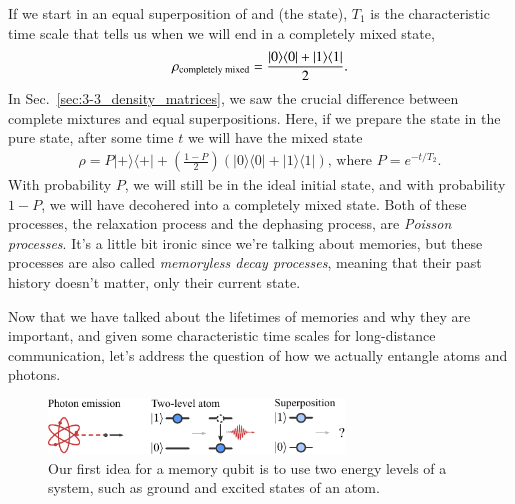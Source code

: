 If we start in an equal superposition of  and  (the \ket{+} state), $T_1$ is the characteristic time scale that tells us when we will end in a completely mixed state,
\begin{equation}
\begin{aligned}
\rho_{\textrm{completely mixed}} =\frac{|0 \rangle \langle 0|+|1 \rangle \langle 1|}{2}.
\end{aligned}
\end{equation}
In Sec.~\ref{sec:3-3_density_matrices}, we saw the crucial difference between complete mixtures and equal superpositions. Here, if we prepare the state in the pure state, after some time $t$ we will have the mixed state
\begin{equation}
\begin{aligned}
\rho=P|+\rangle\langle+|+\left(\frac{1-P}{2}\right)(|0\rangle\langle 0|+| 1\rangle\langle 1|)\text{, where }  P=e^{-t / T_2}.
\end{aligned}
\end{equation}
With probability $P$, we will still be in the ideal initial state, and with probability $1-P$, we will have decohered into a completely mixed state. Both of these processes, the relaxation process and the dephasing process, are \emph{Poisson processes}. It's a little bit ironic since we're talking about memories, but these processes are also called \emph{memoryless decay processes}, meaning that their past history doesn't matter, only their current state.

Now that we have talked about the lifetimes of memories and why they are important, and given some characteristic time scales for long-distance communication, let's address the question of how we actually entangle atoms and photons.

\begin{figure}[t]
    \centering
    \includegraphics[width=0.7\textwidth]{lesson13/13-4_memory-first.pdf}
    \caption[First idea for memory]{Our first idea for a memory qubit is to use two energy levels of a system, such as ground and excited states of an atom.}
    \label{fig:13-memory-first}
\end{figure}

